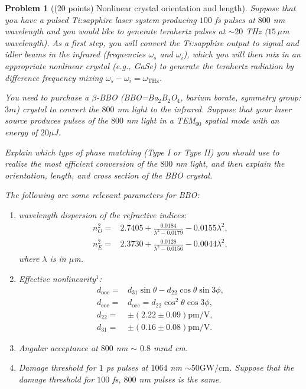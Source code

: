 \documentclass[UTF8,10pt,a4paper]{article}
\theoremstyle{Problem}
\newtheorem{prob}{Problem}
\theoremstyle{Solution}
\begin{document}
\thispagestyle{FirstPageStyle}
\begin{prob}[(20 points) Nonlinear crystal orientation and length]
    Suppose that you have a pulsed Ti:sapphire laser system producing $100$ fs pulses at $800$ nm wavelength and you would like to generate terahertz pulses at $\sim 20$ THz ($15\,\mu$m wavelength). As a first step, you will convert the Ti:sapphire output to signal and idler beams in the infrared (frequencies $\omega_s$ and $\omega_i$), which you will then mix in an appropriate nonlinear crystal (e.g., GaSe) to generate the terahertz radiation by difference frequency mixing $\omega_s-\omega_i=\omega_{\text{THz}}$.

    You need to purchase a $\beta$-BBO (BBO=Ba$_2$B$_2$O$_4$, barium borate, symmetry group: $3m$) crystal to convert the $800$ nm light to the infrared. Suppose that your laser source produces pulses of the $800$ nm light in a TEM$_{00}$ spatial mode with an energy of $20\mu$J.

    Explain which type of phase matching (Type I or Type II) you should use to realize the most efficient conversion of the $800$ nm light, and then explain the orientation, length, and cross section of the BBO crystal.

    The following are some relevant parameters for BBO:
    \begin{enumerate}
        \item[1.] wavelength dispersion of the refractive indices:
        \begin{align}
            \nonumber n_O^2=&2.7405+\frac{0.0184}{\lambda^2-0.0179}-0.0155\lambda^2,\\
            n_E^2=&2.3730+\frac{0.0128}{\lambda^2-0.0156}-0.0044\lambda^2,
        \end{align}
        where $\lambda$ is in $\mu$m.
        \item[2.] Effective nonlinearity$^1$:
        \begin{align}
            \nonumber d_{\text{ooe}}=&d_{31}\sin\theta-d_{22}\cos\theta\sin 3\phi,\\
            \nonumber d_{\text{eoe}}=&d_{\text{oee}}=d_{22}\cos^2\theta\cos 3\phi,\\
            \nonumber d_{22}=&\pm(2.22\pm 0.09)\text{pm}/\text{V},\\
            d_{31}=&\pm(0.16\pm 0.08)\text{pm}/\text{V}.
        \end{align}
        \item[3.] Angular acceptance at $800$ nm $\sim$ $0.8$ mrad cm.
        \item[4.] Damage threshold for $1$ ps pulses at $1064$ nm $\sim 50\text{GW}/\text{cm}$. Suppose that the damage threshold for $100$ fs, $800$ nm pulses is the same.
    \end{enumerate}
\end{prob}
\end{document}
